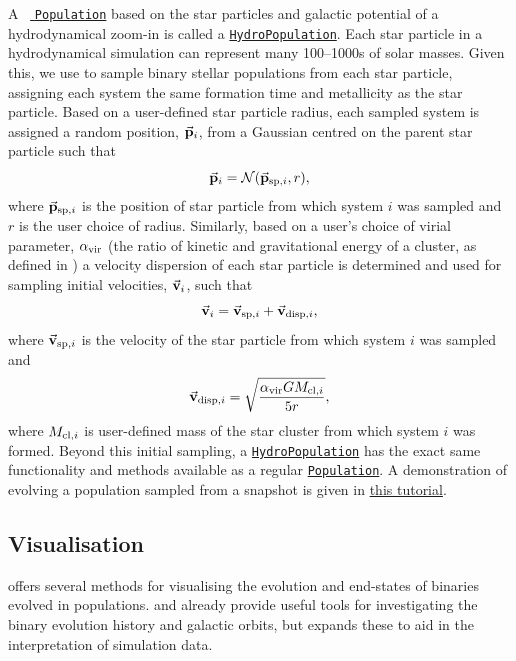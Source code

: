 \documentclass[twocolumn, twocolappendix, oneside]{aastex631}
\newcommand{\codeLink}[2]{{\href{https://cogsworth.readthedocs.io/en/latest/api/cogsworth.#2.#1.html}{\color{codecolour} \texttt{#1}}}}
\newcommand{\tutorialLink}[2]{\href{#1}{{\color{codecolour}#2}}}
\begin{document}
A \cogsworth \ \codeLink{Population}{pop} based on the star particles and galactic potential of a hydrodynamical zoom-in is called a \codeLink{HydroPopulation}{hydro.pop}. Each star particle in a hydrodynamical simulation can represent many 100--1000s of solar masses. Given this, we use \cosmic to sample binary stellar populations from each star particle, assigning each system the same formation time and metallicity as the star particle. Based on a user-defined star particle radius, each sampled system is assigned a random position, $\va{p}_i$, from a Gaussian centred on the parent star particle such that
\begin{equation}
    \va{p}_i = \mathcal{N}(\va{p}_{{\rm sp}, i}, r),
\end{equation}
where $\va{p}_{{\rm sp}, i}$ is the position of star particle from which system $i$ was sampled and $r$ is the user choice of radius. Similarly, based on a user's choice of virial parameter, $\alpha_{\rm vir}$ (the ratio of kinetic and gravitational energy of a cluster, as defined in \citealp{Bertoldi+1992:1992ApJ...395..140B}) a velocity dispersion of each star particle is determined and used for sampling initial velocities, $\va{v}_i$, such that
\begin{equation}
    \va{v}_i = \va{v}_{{\rm sp}, i} + \va{v}_{{\rm disp}, i},
\end{equation}
where $\va{v}_{{\rm sp}, i}$ is the velocity of the star particle from which system $i$ was sampled and
\begin{equation}\label{eq:vel_disp_cluster}
    \va{v}_{{\rm disp}, i} = \sqrt{\frac{\alpha_{\rm vir} G M_{{\rm cl}, i}}{5 r}},
\end{equation}
where $M_{{\rm cl}, i}$ is user-defined mass of the star cluster from which system $i$ was formed. Beyond this initial sampling, a \codeLink{HydroPopulation}{hydro.pop} has the exact same functionality and methods available as a regular \codeLink{Population}{pop}. A demonstration of evolving a population sampled from a snapshot is given in \tutorialLink{https://cogsworth.readthedocs.io/en/latest/tutorials/hydro/pop.html}{this tutorial}.

\subsection{Visualisation}\label{sec:visuals}

\cogsworth offers several methods for visualising the evolution and end-states of binaries evolved in populations. \cosmic and \gala already provide useful tools for investigating the binary evolution history and galactic orbits, but \cogsworth expands these to aid in the interpretation of simulation data.
\end{document}
